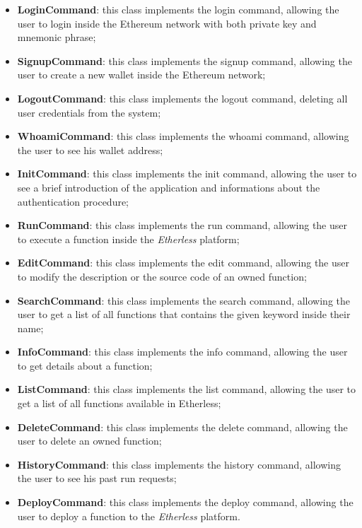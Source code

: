 			\begin{itemize}
				\item \textbf{LoginCommand}: this class implements the login command, allowing the user to login inside the Ethereum network with both private key and mnemonic phrase;
				\item \textbf{SignupCommand}: this class implements the signup command, allowing the user to create a new wallet inside the Ethereum network;
				\item \textbf{LogoutCommand}: this class implements the logout command, deleting all user credentials from the system;
				\item \textbf{WhoamiCommand}: this class implements the whoami command, allowing the user to see his wallet address;
				\item \textbf{InitCommand}: this class implements the init command, allowing the user to see a brief introduction of the application and informations about the authentication procedure;
				\item \textbf{RunCommand}: this class implements the run command, allowing the user to execute a function inside the \textit{Etherless} platform;
				\item \textbf{EditCommand}: this class implements the edit command, allowing the user to modify the description or the source code of an owned function;
				\item \textbf{SearchCommand}: this class implements the search command, allowing the user to get a list of all functions that contains the given keyword inside their name;
				\item \textbf{InfoCommand}: this class implements the info command, allowing the user to get details about a function;
				\item \textbf{ListCommand}: this class implements the list command, allowing the user to get a list of all functions available in Etherless;
				\item \textbf{DeleteCommand}: this class implements the delete command, allowing the user to delete an owned function;
				\item \textbf{HistoryCommand}: this class implements the history command, allowing the user to see his past run requests;
				\item \textbf{DeployCommand}: this class implements the deploy command, allowing the user to deploy a function to the \textit{Etherless} platform.
			\end{itemize}

